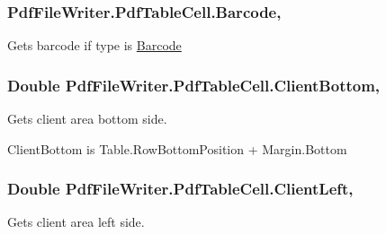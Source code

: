 \subsubsection[{\texorpdfstring{Barcode}{Barcode}}]{ Pdf\+File\+Writer.\+Pdf\+Table\+Cell.\+Barcode\hspace{0.3cm}{\ttfamily [get]}, {\ttfamily [set]}}\hypertarget{class_pdf_file_writer_1_1_pdf_table_cell_a2666d0c7e3a91dfc08d3869746af2917}{}\label{class_pdf_file_writer_1_1_pdf_table_cell_a2666d0c7e3a91dfc08d3869746af2917}


Gets barcode if type is \hyperlink{class_pdf_file_writer_1_1_barcode}{Barcode} 

\subsubsection[{\texorpdfstring{Client\+Bottom}{ClientBottom}}]{\setlength{\rightskip}{0pt plus 5cm}Double Pdf\+File\+Writer.\+Pdf\+Table\+Cell.\+Client\+Bottom\hspace{0.3cm}{\ttfamily [get]}, {\ttfamily [set]}}\hypertarget{class_pdf_file_writer_1_1_pdf_table_cell_a6df28b9f502f3675e45020d040069491}{}\label{class_pdf_file_writer_1_1_pdf_table_cell_a6df28b9f502f3675e45020d040069491}


Gets client area bottom side. 

Client\+Bottom is Table.\+Row\+Bottom\+Position + Margin.\+Bottom 
\subsubsection[{\texorpdfstring{Client\+Left}{ClientLeft}}]{\setlength{\rightskip}{0pt plus 5cm}Double Pdf\+File\+Writer.\+Pdf\+Table\+Cell.\+Client\+Left\hspace{0.3cm}{\ttfamily [get]}, {\ttfamily [set]}}\hypertarget{class_pdf_file_writer_1_1_pdf_table_cell_a663f77eb8443cf0e7eba1c79fe75313a}{}\label{class_pdf_file_writer_1_1_pdf_table_cell_a663f77eb8443cf0e7eba1c79fe75313a}


Gets client area left side. 

